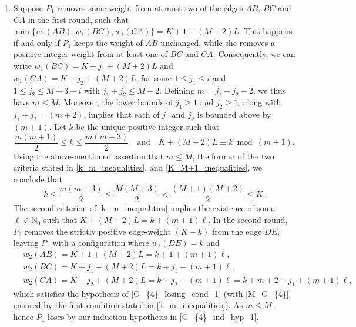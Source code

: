 \documentclass[11pt,reqno]{amsart}
\theoremstyle{definition}
\theoremstyle{definition}
\begin{document}
\begin{enumerate}
\item Suppose $P_{1}$ removes some weight from at most two of the edges $AB$, $BC$ and $CA$ in the first round, such that $\min\{w_{1}(AB),w_{1}(BC),w_{1}(CA)\}=K+1+(M+2)L$. This happens if and only if $P_{1}$ keeps the weight of $AB$ unchanged, while she removes a positive integer weight from at least one of $BC$ and $CA$. Consequently, we can write $w_{1}(BC)=K+j_{1}+(M+2)L$ and $w_{1}(CA)=K+j_{2}+(M+2)L$, for some $1 \leqslant j_{1} \leqslant i$ and $1 \leqslant j_{2} \leqslant M+3-i$ with $j_{1}+j_{2} \leqslant M+2$. Defining $m=j_{1}+j_{2}-2$, we thus have $m \leqslant M$. Moreover, the lower bounds of $j_{1} \geqslant 1$ and $j_{2} \geqslant 1$, along with $j_{1}+j_{2}=(m+2)$, implies that each of $j_{1}$ and $j_{2}$ is bounded above by $(m+1)$. Let $k$ be the unique positive integer such that
\begin{equation}
\frac{m(m+1)}{2} \leqslant k \leqslant \frac{m(m+3)}{2} \quad \text{and} \quad K+(M+2)L \equiv k \bmod (m+1).\label{k_m_inequalities}
\end{equation}
Using the above-mentioned assertion that $m \leqslant M$, the former of the two criteria stated in \eqref{k_m_inequalities}, and \eqref{K_M+1_inequalities}, we conclude that 
\begin{equation}
k \leqslant \frac{m(m+3)}{2} \leqslant \frac{M(M+3)}{2} < \frac{(M+1)(M+2)}{2} \leqslant K.\nonumber
\end{equation}
The second criterion of \eqref{k_m_inequalities} implies the existence of some $\ell \in \mathbb{N}_{0}$ such that $K+(M+2)L=k+(m+1)\ell$. In the second round, $P_{2}$ removes the strictly positive edge-weight $(K-k)$ from the edge $DE$, leaving $P_{1}$ with a configuration where $w_{2}(DE)=k$ and 
\begin{align}
{}&w_{2}(AB)=K+1+(M+2)L=k+1+(m+1)\ell, \nonumber\\
{}&w_{2}(BC)=K+j_{1}+(M+2)L=k+j_{1}+(m+1)\ell,\nonumber\\
{}&w_{2}(CA)=K+j_{2}+(M+2)L=k+j_{2}+(m+1)\ell=k+m+2-j_{1}+(m+1)\ell,\nonumber
\end{align} 
which satisfies the hypothesis of \eqref{G_{4}_losing_cond_1} (with \eqref{M_G_{4}} ensured by the first condition stated in \eqref{k_m_inequalities}). As $m \leqslant M$, hence $P_{1}$ loses by our induction hypothesis in \eqref{G_{4}_ind_hyp_1}. 


\end{enumerate}
\end{document}
